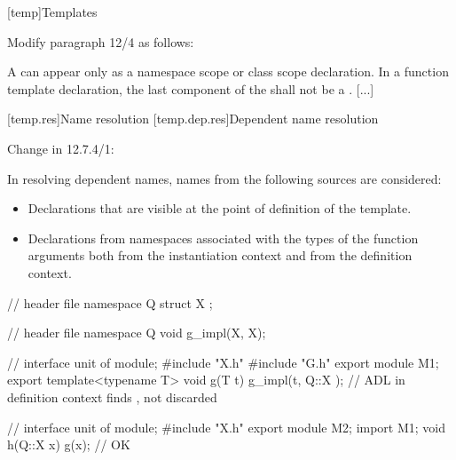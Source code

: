 \setcounter{chapter}{11}
[temp]{Templates}%

\noindent
Modify paragraph 12/4 as follows:
\begin{std.txt}
  \resetalinea[1]
  \alinea
  A  can appear only as a 
  namespace scope or class scope declaration.
  In a function template declaration, the last component of the 
   shall not be a . 
  [...]
\end{std.txt}






\setcounter{section}{6}
[temp.res]{Name resolution}
\setcounter{subsection}{3}
[temp.dep.res]{Dependent name resolution}

Change in 12.7.4/1:

\begin{std.txt}
\resetalinea[0]
\alinea
In resolving dependent names, names from the following sources are considered:
\begin{itemize}
\item
Declarations that are visible at the point of definition of the template.
\item
Declarations from namespaces associated with the types of the function
arguments both from the instantiation context
 \added{(\ref{dcl.module.context})}
and from the definition context.
\end{itemize}
\enterexample\color{addclr}
\begin{codeblock}
// header file 
namespace Q { 
  struct X { };
}

// header file 
namespace Q {
  void g_impl(X, X);
}

// interface unit of 
module;
#include "X.h"
#include "G.h"
export module M1;
export template<typename T>
void g(T t) {
  g_impl(t, Q::X{ });   // ADL in definition context finds ,  not discarded
}

// interface unit of 
module;
#include "X.h"
export module M2;
import M1;
void h(Q::X x) {
   g(x);                // OK
}
\end{codeblock}
\exitexample
\end{std.txt}

